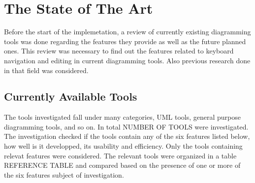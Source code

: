 \chapter{The State of The Art}
\beginchapter
\begin{comment}
=======================================

[there are some stuff that i wrote during the research, i will try to re-use them, it's still not complete]

say that i investigated a number of tools, which type of tools, what was the investigation criteria, state the features that of the comparision criteria, meaning of $+ and -$ and put the table.

each feature, take each tool with + or ++ divide them into categories, compare the tools from the point of view of each feature together.

add conclusion @ the end\\
========================================
\end{comment}

Before the start of the implemetation, a review of currently existing diagramming tools was done regarding the features they provide as well as the future planned ones. This review was necessary to find out the features related to keyboard navigation and editing in current diagramming tools. Also previous research done in that field was considered.

\section{Currently Available Tools}
The tools investigated fall under many categories, UML tools, general purpose diagramming tools, and so on. In total NUMBER OF TOOLS were investigated. The investigation checked if the tools contain any of the six features listed below, how well is it developped, its usability and efficiency. Only the tools containing relevat features were considered. The relevant tools were organized in a table REFERENCE TABLE and compared based on the presence of one or more of the six features subject of investigation.

